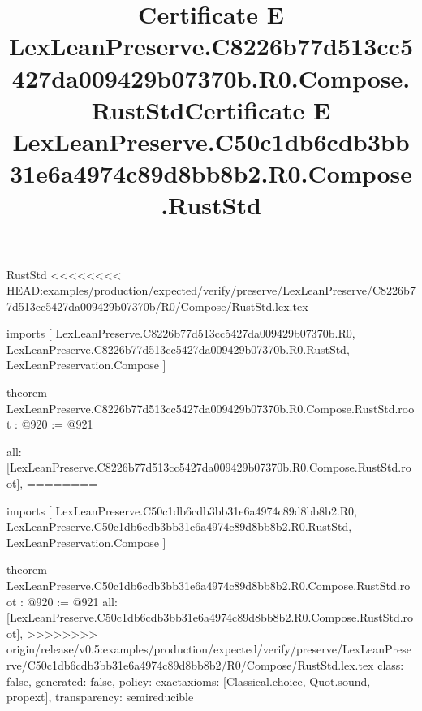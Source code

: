 \begin{lexlean}{RustStd}
<<<<<<<< HEAD:examples/production/expected/verify/preserve/LexLeanPreserve/C8226b77d513cc5427da009429b07370b/R0/Compose/RustStd.lex.tex
\title{Certificate E LexLeanPreserve.C8226b77d513cc5427da009429b07370b.R0.Compose.RustStd}
\begin{coremodule}
imports [
  LexLeanPreserve.C8226b77d513cc5427da009429b07370b.R0,
  LexLeanPreserve.C8226b77d513cc5427da009429b07370b.R0.RustStd,
  LexLeanPreservation.Compose
]

theorem LexLeanPreserve.C8226b77d513cc5427da009429b07370b.R0.Compose.RustStd.root : @920 := @921 {
  all: [LexLeanPreserve.C8226b77d513cc5427da009429b07370b.R0.Compose.RustStd.root],
========
\title{Certificate E LexLeanPreserve.C50c1db6cdb3bb31e6a4974c89d8bb8b2.R0.Compose.RustStd}
\begin{coremodule}
imports [
  LexLeanPreserve.C50c1db6cdb3bb31e6a4974c89d8bb8b2.R0,
  LexLeanPreserve.C50c1db6cdb3bb31e6a4974c89d8bb8b2.R0.RustStd,
  LexLeanPreservation.Compose
]

theorem LexLeanPreserve.C50c1db6cdb3bb31e6a4974c89d8bb8b2.R0.Compose.RustStd.root : @920 := @921 {
  all: [LexLeanPreserve.C50c1db6cdb3bb31e6a4974c89d8bb8b2.R0.Compose.RustStd.root],
>>>>>>>> origin/release/v0.5:examples/production/expected/verify/preserve/LexLeanPreserve/C50c1db6cdb3bb31e6a4974c89d8bb8b2/R0/Compose/RustStd.lex.tex
  class: false,
  generated: false,
  policy: exact{axioms: [Classical.choice, Quot.sound, propext]},
  transparency: semireducible
}


\end{coremodule}}
\end{coremodule}
\end{lexlean}
